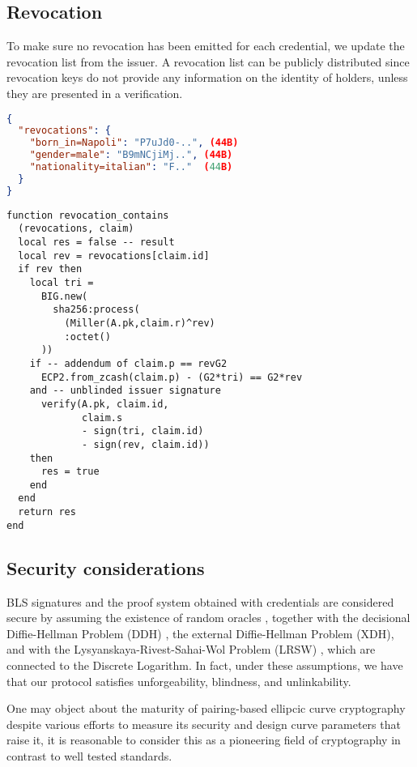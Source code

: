 \documentclass[conference]{IEEEtran}
\begin{document}
\subsection{Revocation}

To make sure no revocation has been emitted for each credential, we update the revocation list from the issuer. A revocation list can be publicly distributed since revocation keys do not provide any information on the identity of holders, unless they are presented in a verification.

\begin{lstlisting}[language=json,caption={Revocation list}]
{
  "revocations": {
    "born_in=Napoli": "P7uJd0-..", (44B)
    "gender=male": "B9mNCjiMj..", (44B)
    "nationality=italian": "F.."  (44B)
  }
}
\end{lstlisting}

\begin{lstlisting}[style=lua,caption={Holder presents credentials}]
function revocation_contains
  (revocations, claim)
  local res = false -- result
  local rev = revocations[claim.id]
  if rev then
    local tri =
      BIG.new(
        sha256:process(
          (Miller(A.pk,claim.r)^rev)
          :octet()
      ))
    if -- addendum of claim.p == revG2
      ECP2.from_zcash(claim.p) - (G2*tri) == G2*rev
    and -- unblinded issuer signature
      verify(A.pk, claim.id,
             claim.s
             - sign(tri, claim.id)
             - sign(rev, claim.id))
    then
      res = true
    end
  end
  return res
end
\end{lstlisting}

\subsection{Security considerations}

BLS signatures and the proof system obtained with credentials are
considered secure by assuming the existence of random oracles
\cite{random-oracle}, together with the decisional Diffie-Hellman
Problem (DDH) \cite{DDH-problem}, the external Diffie-Hellman Problem
(XDH), and with the Lysyanskaya-Rivest-Sahai-Wol Problem (LRSW)
\cite{lrsw-assumption}, which are connected to the Discrete
Logarithm. In fact, under these assumptions, we have that our protocol
satisfies unforgeability, blindness, and unlinkability.

One may object about the maturity of pairing-based ellipcic curve
cryptography despite various efforts to measure its security and
design curve parameters that raise it, it is reasonable to consider
this as a pioneering field of cryptography in contrast to well tested
standards.
\end{document}
